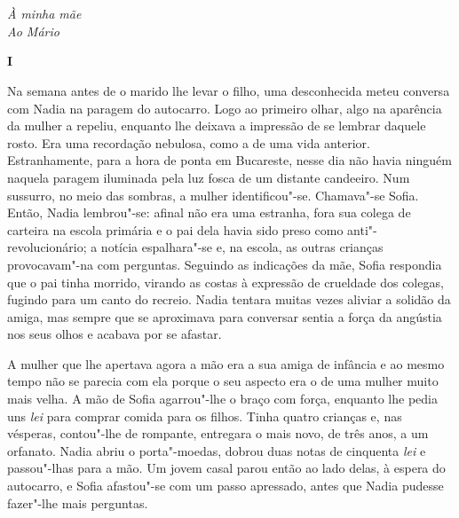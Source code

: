 \chapter*{}
\thispagestyle{empty}

\begin{flushright}
\vfill
\emph{À minha mãe\\Ao Mário}
\end{flushright}

\pagebreak
\thispagestyle{empty}
\movetooddpage

\pagebreak
\vspace*{1.8cm}
\noindent{}\textbf{I}

\bigskip

\noindent{}Na semana antes de o marido lhe levar o filho, uma desconhecida meteu
conversa com Nadia na paragem do autocarro. Logo ao primeiro olhar, algo
na aparência da mulher a repeliu, enquanto lhe deixava a impressão de se
lembrar daquele rosto. Era uma recordação nebulosa, como a de uma vida
anterior. Estranhamente, para a hora de ponta em Bucareste, nesse dia
não havia ninguém naquela paragem iluminada pela luz fosca de um
distante candeeiro. Num sussurro, no meio das sombras, a mulher
identificou"-se. Chamava"-se Sofia. Então, Nadia lembrou"-se: afinal não era uma estranha, fora sua colega de carteira na
escola primária e o pai dela havia sido preso como anti"-revolucionário;
a notícia espalhara"-se e, na escola, as outras crianças provocavam"-na
com perguntas. Seguindo as indicações da mãe, Sofia respondia que o pai
tinha morrido, virando as costas à expressão de crueldade dos colegas,
fugindo para um canto do recreio. Nadia tentara muitas vezes aliviar a
solidão da amiga, mas sempre que se aproximava para conversar sentia a
força da angústia nos seus olhos e acabava por se afastar.

A mulher que lhe apertava agora a mão era a sua amiga de infância e ao
mesmo tempo não se parecia com ela porque o seu aspecto era o de uma
mulher muito mais velha. A mão de Sofia agarrou"-lhe o braço com força,
enquanto lhe pedia uns \emph{lei} para comprar comida para os filhos.
Tinha quatro crianças e, nas vésperas, contou"-lhe de rompante, entregara
o mais novo, de três anos, a um orfanato. Nadia abriu o porta"-moedas,
dobrou duas notas de cinquenta \emph{lei} e passou"-lhas para a mão. Um
jovem casal parou então ao lado delas, à espera do autocarro, e Sofia
afastou"-se com um passo apressado, antes que Nadia pudesse fazer"-lhe
mais perguntas.

